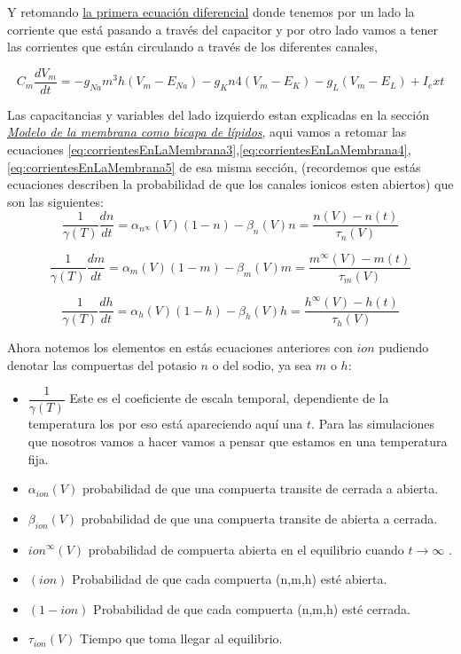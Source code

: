 Y retomando \hyperlink{LaEq}{la primera ecuación diferencial} donde tenemos por un lado la corriente que está pasando a través del capacitor y por otro lado vamos a tener las corrientes que están circulando a través de los diferentes canales, 

\begin{equation}
  C_{m} \dfrac{dV_{m}}{dt} =  - g_{Na} m^3 h(V_{m} - E_{Na} ) - g_{K} n 4 (V_{m} - E_{K} ) - g_{L} (V_{m} - E_{L} ) + I_ext
  \label{eq:corrientesRepaso}
\end{equation}

Las capacitancias y variables del lado izquierdo estan explicadas en la sección \hyperlink{secc}{\emph{Modelo de la membrana como bicapa de lípidos}}, aqui vamos a retomar las ecuaciones \ref{eq:corrientesEnLaMembrana3},\ref{eq:corrientesEnLaMembrana4},\ref{eq:corrientesEnLaMembrana5} de esa misma sección, (recordemos que estás ecuaciones describen la probabilidad de que los canales ionicos esten abiertos) que son las siguientes:
\begin{equation}
  \dfrac{1}{\gamma(T)}\dfrac{dn}{dt} =  \alpha_{n^\infty} (V)(1 - n) - \beta_{n} (V) n = \dfrac{n(V)-n(t)}{\tau_{n}(V)}
  \label{eq:probabilidades1}
\end{equation}

\begin{equation}
  \dfrac{1}{\gamma(T)}\dfrac{dm}{dt} =  \alpha_{m} (V)(1 - m) - \beta_{m} (V) m = \dfrac{m^\infty(V)-m(t)}{\tau_{m}(V)}
  \label{eq:probabilidades2}
\end{equation}

\begin{equation}
  \dfrac{1}{\gamma(T)}\dfrac{dh}{dt} =  \alpha_{h} (V)(1 - h) - \beta_{h} (V) h = \dfrac{h^\infty(V)-h(t)}{\tau_{h}(V)}
  \label{eq:probabilidades3}
\end{equation}

Ahora notemos los elementos en estás ecuaciones anteriores con \(ion\) pudiendo denotar las compuertas del potasio \(n\) o del sodio, ya sea \(m\) o \(h\):
\begin{itemize}
 \item \(\dfrac{1}{\gamma(T)}\) Este es el coeficiente de escala temporal, dependiente de la temperatura los por eso está apareciendo aquí una \(t\). Para las simulaciones que nosotros vamos a hacer vamos a pensar que estamos en una temperatura fija. 
 \item \(\alpha_{ion}(V)\) probabilidad de que una compuerta transite de cerrada a abierta.
 \item \(\beta_{ion}(V)\) probabilidad de que una compuerta transite de abierta a cerrada.
 \item \(ion^\infty(V)\) probabilidad de compuerta abierta en el equilibrio cuando \(t \rightarrow \infty\) .
 \item \((ion)\) Probabilidad de que cada compuerta (n,m,h) esté abierta.
 \item \((1-ion)\) Probabilidad de que cada compuerta (n,m,h) esté cerrada.
 
 \item \(\tau_{ion}(V)\) Tiempo que toma llegar al equilibrio.
\end{itemize}


